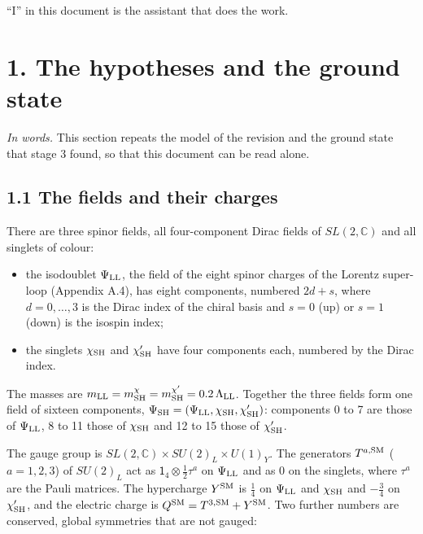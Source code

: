 \documentclass[
  10pt,
]{article}
\providecommand{\tightlist}{%
  \setlength{\itemsep}{0pt}\setlength{\parskip}{0pt}}
\begin{document}
``I'' in this document is the assistant that does the work.

\hypertarget{the-hypotheses-and-the-ground-state}{%
\section{1. The hypotheses and the ground
state}\label{the-hypotheses-and-the-ground-state}}

\emph{In words.} This section repeats the model of the revision and the
ground state that stage 3 found, so that this document can be read
alone.

\hypertarget{the-fields-and-their-charges}{%
\subsection{1.1 The fields and their
charges}\label{the-fields-and-their-charges}}

There are three spinor fields, all four-component Dirac fields of
\(SL(2,\mathbb C)\) and all singlets of colour:

\begin{itemize}
\tightlist
\item
  the isodoublet \(\Psi_{\rm LL}\), the field of the eight spinor
  charges of the Lorentz super-loop (Appendix A.4), has eight
  components, numbered \(2d+s\), where \(d=0,\dots,3\) is the Dirac
  index of the chiral basis and \(s=0\) (up) or \(s=1\) (down) is the
  isospin index;
\item
  the singlets \(\chi_{\rm SH}\) and \(\chi'_{\rm SH}\) have four
  components each, numbered by the Dirac index.
\end{itemize}

The masses are
\(m_{\rm LL}=m^\chi_{\rm SH}=m^{\chi'}_{\rm SH}=0.2\,\Lambda_{\rm LL}\).
Together the three fields form one field of sixteen components,
\(\Psi_{\rm SH}=(\Psi_{\rm LL},\chi_{\rm SH},\chi'_{\rm SH})\):
components 0 to 7 are those of \(\Psi_{\rm LL}\), 8 to 11 those of
\(\chi_{\rm SH}\) and 12 to 15 those of \(\chi'_{\rm SH}\).

The gauge group is \(SL(2,\mathbb C)\times SU(2)_L\times U(1)_Y\). The
generators \(T^{a,{\rm SM}}\) (\(a=1,2,3\)) of \(SU(2)_L\) act as
\(\mathsf 1_4\otimes\tfrac12\tau^a\) on \(\Psi_{\rm LL}\) and as 0 on
the singlets, where \(\tau^a\) are the Pauli matrices. The hypercharge
\(Y^{\rm SM}\) is \(\tfrac14\) on \(\Psi_{\rm LL}\) and
\(\chi_{\rm SH}\) and \(-\tfrac34\) on \(\chi'_{\rm SH}\), and the
electric charge is \(Q^{\rm SM}=T^{3,{\rm SM}}+Y^{\rm SM}\). Two further
numbers are conserved, global symmetries that are not gauged:
\end{document}
